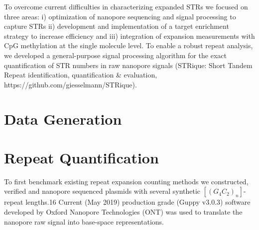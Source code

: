 To overcome current difficulties in characterizing expanded STRs we focused on three areas: i) optimization of nanopore sequencing and signal processing to capture STRs ii) development and implementation of a target enrichment strategy to increase efficiency and iii) integration of expansion measurements with CpG methylation at the single molecule level.
To enable a robust repeat analysis, we developed a general-purpose signal processing algorithm for the exact quantification of STR numbers in raw nanopore signals (STRique: Short Tandem Repeat identification, quantification \& evaluation, https://github.com/giesselmann/STRique). 


\section{Data Generation}
\label{sec:strique:data}



\section{Repeat Quantification}
\label{sec:strique:quantification}

To first benchmark existing repeat expansion counting methods we constructed, verified and nanopore sequenced plasmids with several synthetic $ [(G_{4}C_{2})_{n}] $-repeat lengths.16 Current (May 2019) production grade (Guppy v3.0.3) software developed by Oxford Nanopore Technologies (ONT) was used to translate the nanopore raw signal into base-space representations.

